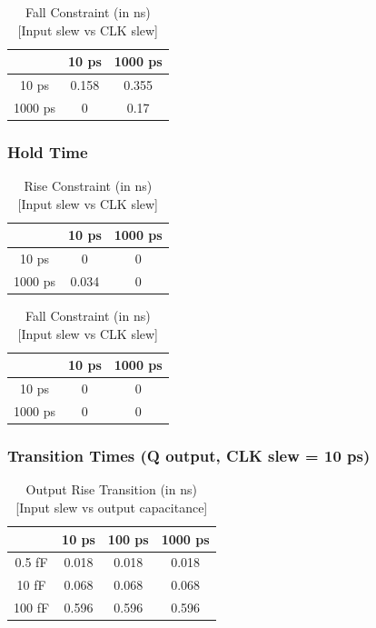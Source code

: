 \documentclass[12pt]{article}
\begin{document}
\begin{table}[H]
	\centering
	\begin{tabular}{|c|c|c|}
		\hline
		        & 10 ps & 1000 ps \\ \hline
		10 ps   & 0.158 & 0.355   \\ \hline
		1000 ps & 0     & 0.17    \\ \hline
	\end{tabular}
	\caption{Fall Constraint (in ns) [Input slew vs CLK slew]}
\end{table}

\subsubsection{Hold Time}

\begin{table}[H]
	\centering
	\begin{tabular}{|c|c|c|}
		\hline
		        & 10 ps & 1000 ps \\ \hline
		10 ps   & 0     & 0       \\ \hline
		1000 ps & 0.034 & 0       \\ \hline
	\end{tabular}
	\caption{Rise Constraint (in ns) [Input slew vs CLK slew]}
\end{table}

\begin{table}[H]
	\centering
	\begin{tabular}{|c|c|c|}
		\hline
		        & 10 ps & 1000 ps \\ \hline
		10 ps   & 0     & 0       \\ \hline
		1000 ps & 0     & 0       \\ \hline
	\end{tabular}
	\caption{Fall Constraint (in ns) [Input slew vs CLK slew]}
\end{table}

\subsubsection{Transition Times (Q output, CLK slew = 10 ps)}

\begin{table}[H]
	\centering
	\begin{tabular}{|c|c|c|c|}
		\hline
		       & 10 ps & 100 ps & 1000 ps \\ \hline
		0.5 fF & 0.018 & 0.018  & 0.018   \\ \hline
		10 fF  & 0.068 & 0.068  & 0.068   \\ \hline
		100 fF & 0.596 & 0.596  & 0.596   \\ \hline
	\end{tabular}
	\caption{Output Rise Transition (in ns) [Input slew vs output capacitance]}
\end{table}
\end{document}
